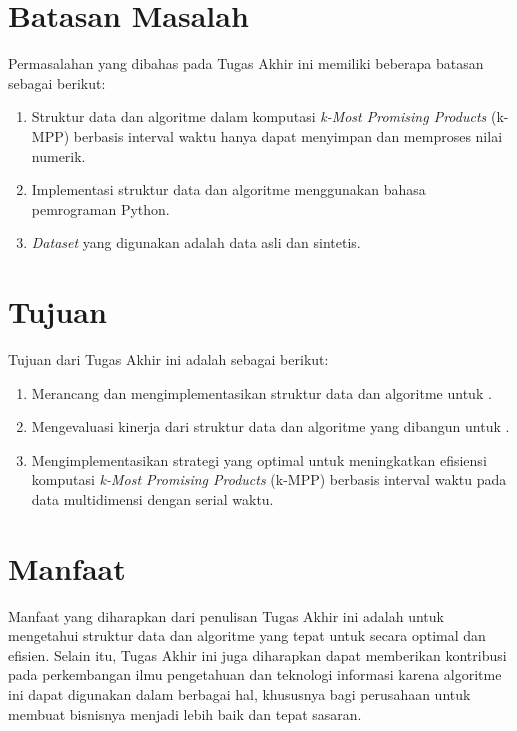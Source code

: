 \section{Batasan Masalah}
\tab Permasalahan yang dibahas pada Tugas Akhir ini memiliki beberapa batasan sebagai berikut:
\begin{enumerate}
	\item Struktur data dan algoritme dalam komputasi \textit{k-Most Promising Products} (k-MPP) berbasis interval waktu hanya dapat menyimpan dan memproses nilai numerik.
	\item Implementasi struktur data dan algoritme menggunakan bahasa pemrograman Python.
	\item \textit{Dataset} yang digunakan adalah data asli dan sintetis.
\end{enumerate}

\section{Tujuan}
\tab Tujuan dari Tugas Akhir ini adalah sebagai berikut:

\begin{enumerate}
	\item Merancang dan mengimplementasikan struktur data dan algoritme untuk \problemm.
	\item Mengevaluasi kinerja dari struktur data dan algoritme yang dibangun untuk \problemm.
	\pagebreak
	\item Mengimplementasikan strategi yang optimal untuk meningkatkan efisiensi komputasi \textit{k-Most Promising Products} (k-MPP) berbasis interval waktu pada data multidimensi dengan serial waktu.
\end{enumerate}

\section{Manfaat}
\tab Manfaat yang diharapkan dari penulisan Tugas Akhir ini adalah untuk mengetahui struktur data dan algoritme yang tepat untuk \problemm secara optimal dan efisien. Selain itu, Tugas Akhir ini juga diharapkan dapat memberikan kontribusi pada perkembangan ilmu pengetahuan dan teknologi informasi karena algoritme ini dapat digunakan dalam berbagai hal, khususnya bagi perusahaan untuk membuat bisnisnya menjadi lebih baik dan tepat sasaran.

